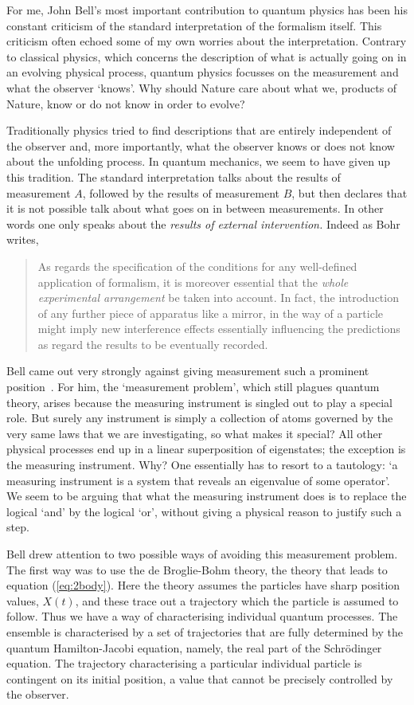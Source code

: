 \documentclass[12pt]{article}
\begin{document}
 For me, John Bell's most important contribution to quantum physics has been his constant criticism of the standard interpretation of the formalism itself.  This criticism often echoed some of my own worries about the interpretation.  Contrary to classical physics, which concerns the description of what is actually going on in an evolving  physical process, quantum physics focusses on the measurement and what the observer `knows'.  Why should Nature care about what we, products of Nature, know or do not know in order to evolve?  
 
Traditionally physics tried to find descriptions that are entirely independent of the observer and, more importantly, what the observer knows or does not know about the unfolding process.  In quantum mechanics, we seem to have given up this tradition.  The standard interpretation talks about the results of measurement $A$, followed by the results of measurement $B$, but then declares that it is not possible talk about what goes on in between measurements.  In other words one only speaks about the {\em results of external intervention.}  Indeed as Bohr~\cite{nb61} writes,
\begin{quote}
As regards the specification of the conditions for any well-defined application of formalism, it is moreover essential that the {\em whole experimental arrangement} be taken into account.  In fact, the introduction of any further piece of apparatus like a mirror, in the way of a particle might imply new interference effects essentially influencing the predictions as regard the results to be eventually recorded.
\end{quote}
Bell came out very strongly against giving measurement such a prominent position~\cite{jb90}.
For him, the `measurement problem', which still plagues quantum theory, arises because the measuring instrument is singled out to play a special role. But surely any instrument is simply a collection of atoms governed by the very same laws that  we are investigating, so what makes it special?   All other physical processes end up in a linear superposition of eigenstates; the exception is the measuring instrument.  Why?
One essentially has to resort to a tautology:    `a measuring instrument is a system that reveals an eigenvalue of some operator'.  We seem to be arguing that what the measuring instrument does is to replace the logical `and' by the logical `or', without giving a physical reason to justify such a step.

Bell drew attention to two possible ways of avoiding this measurement problem.  The first way was to use the de Broglie-Bohm theory, the theory that leads to equation (\ref{eq:2body}).  Here the theory assumes the particles have sharp position values, $X(t)$, and these trace out a trajectory which the particle is assumed to follow.  Thus we have a way of characterising individual quantum processes.  The ensemble is characterised by a set of trajectories that are fully determined by the quantum  Hamilton-Jacobi equation, namely, the real part of the Schr\"{o}dinger equation.  The trajectory characterising a particular individual particle  is contingent on its initial position, a value that cannot be precisely controlled by the observer.
\end{document}
